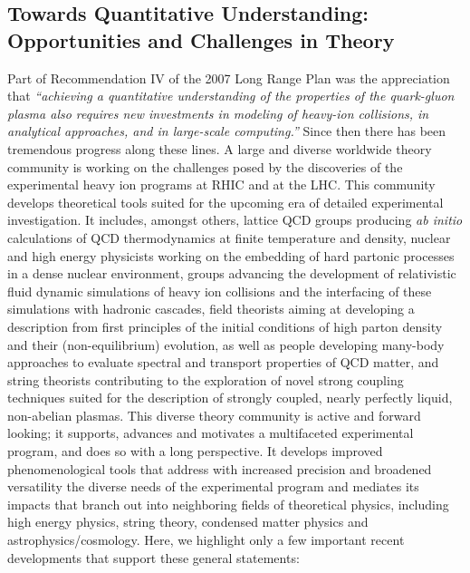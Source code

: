 \subsection{Towards Quantitative Understanding: Opportunities and Challenges in Theory}
\label{Sec:Theory}

Part of Recommendation IV of the 2007 Long Range Plan was the appreciation that 
{\em ``achieving a quantitative understanding of the properties of the quark-gluon plasma 
also requires new investments in modeling of heavy-ion collisions, in analytical approaches, and in large-scale computing.''} Since then there has been tremendous progress along these lines.
A large and diverse worldwide theory community is working on the challenges
posed by the discoveries of the experimental heavy ion programs at RHIC and at the LHC.
This community develops theoretical tools suited for the upcoming era of detailed experimental
investigation. It includes, amongst others, lattice QCD groups producing
{\em ab initio} calculations of QCD thermodynamics
at  finite temperature and density, nuclear and high energy physicists 
working on the embedding of hard partonic processes in a dense nuclear environment, groups advancing
the development of relativistic fluid dynamic simulations of heavy ion collisions and the interfacing of these
simulations with hadronic cascades, field theorists aiming at developing a description from first principles of
the initial conditions of high parton density and their (non-equilibrium) evolution, 
as well as people developing many-body approaches to evaluate spectral and transport properties of QCD matter,
and string theorists contributing
to the exploration of novel strong coupling techniques suited for the description of strongly coupled, 
nearly perfectly liquid, non-abelian plasmas. 
This diverse theory community is active and forward looking;
it supports, advances and motivates a multifaceted
experimental program, and does so 
with a long perspective. It develops improved 
phenomenological tools that address with increased precision and broadened versatility the diverse needs of 
the experimental program and mediates its impacts that branch out into neighboring fields of theoretical physics,
including high energy physics, string theory, condensed matter physics 
and astrophysics/cosmology. Here, we highlight only a few 
important recent developments that support these general statements:

